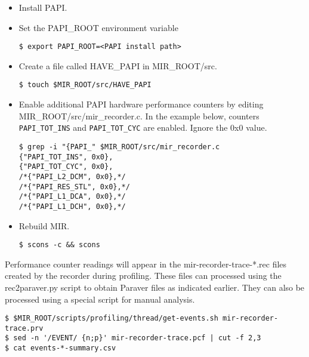 \documentclass[11pt,a4paper]{article}
\begin{document}
\begin{itemize}
    \item Install PAPI.
    \item Set the \textsf{PAPI\_ROOT} environment variable

\begin{lstlisting}[style=MyInputStyle]
$ export PAPI_ROOT=<PAPI install path>
\end{lstlisting}

    \item Create a file called \textsf{HAVE\_PAPI} in \textsf{MIR\_ROOT/src}.

\begin{lstlisting}[style=MyInputStyle]
$ touch $MIR_ROOT/src/HAVE_PAPI
\end{lstlisting}

    \item Enable additional PAPI hardware performance counters by editing \textsf{MIR\_ROOT/src/mir\_recorder.c}. In the example below, counters \\ \texttt{PAPI\_TOT\_INS} and \texttt{PAPI\_TOT\_CYC} are enabled. Ignore the 0x0 value.

\begin{lstlisting}[style=MyInputStyle]
$ grep -i "{PAPI_" $MIR_ROOT/src/mir_recorder.c
{"PAPI_TOT_INS", 0x0},
{"PAPI_TOT_CYC", 0x0},
/*{"PAPI_L2_DCM", 0x0},*/
/*{"PAPI_RES_STL", 0x0},*/
/*{"PAPI_L1_DCA", 0x0},*/
/*{"PAPI_L1_DCH", 0x0},*/
\end{lstlisting}

    \item Rebuild MIR.

\begin{lstlisting}[style=MyInputStyle]
$ scons -c && scons
\end{lstlisting}
\end{itemize}

Performance counter readings will appear in the \textsf{mir-recorder-trace-*.rec} files created by the recorder during profiling. These files can processed using the \textsf{rec2paraver.py} script to obtain Paraver files as indicated earlier. They can also be processed using a special script for manual analysis.

\begin{lstlisting}[style=MyInputStyle]
$ $MIR_ROOT/scripts/profiling/thread/get-events.sh mir-recorder-trace.prv
$ sed -n '/EVENT/ {n;p}' mir-recorder-trace.pcf | cut -f 2,3
$ cat events-*-summary.csv
\end{lstlisting}
\end{document}
